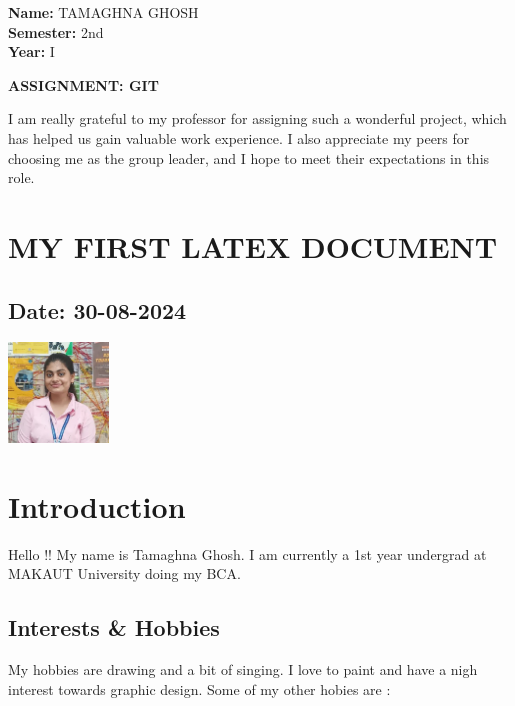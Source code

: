 \documentclass[12pt]{article}
\begin{document}
\begin{flushright}
\textbf{Name:} TAMAGHNA GHOSH \\
\textbf{Semester:} 2nd \\
\textbf{Year:} I \\
\end{flushright}

\begin{center}
\Huge \textbf{ASSIGNMENT: GIT}
\end{center}

I am really grateful to my professor for assigning such a wonderful project, which has helped us gain valuable work experience. I also appreciate my peers for choosing me as the group leader, and I hope to meet their expectations in this role.


\newpage

\section{MY FIRST LATEX DOCUMENT}
\subsection*{Date: 30-08-2024}

\begin{center}
    \includegraphics[width=0.2\textwidth]{tamaghna.jpg}\\[1cm]
    
\end{center}

\section*{Introduction}
Hello !! My name is Tamaghna Ghosh. I am currently a 1st year undergrad at MAKAUT University doing my BCA.

\subsection*{Interests \& Hobbies}
My hobbies are drawing and a bit of singing. I love to paint and have a nigh interest towards graphic design. Some of my other hobies are :
\end{document}
